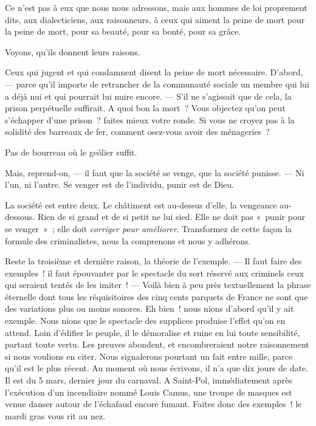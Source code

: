 \documentclass[french,twoside]{book} %
\begin{document}
 Ce n’est pas à eux que nous nous adressons, mais aux hommes de loi proprement dits, aux dialecticiens, aux raisonneurs, à ceux qui aiment la peine de mort pour la peine de mort, pour sa beauté, pour sa bonté, pour sa grâce.\par
Voyons, qu’ils donnent leurs raisons.\par
Ceux qui jugent et qui condamnent disent la peine de mort nécessaire. D’abord, — parce qu’il importe de retrancher de la communauté sociale un membre qui lui a déjà nui et qui pourrait lui nuire encore. — S’il ne s’agissait que de cela, la prison perpétuelle suffirait. A quoi bon la mort ? Vous objectez qu’on peut s’échapper d’une prison ? faites mieux votre ronde. Si vous ne croyez pas à la solidité des barreaux de fer, comment osez-vous avoir des ménageries ?\par
Pas de bourreau où le geôlier suffit.\par
Mais, reprend-on, — il faut que la société se venge, que la société punisse. — Ni l’un, ni l’autre. Se venger est de l’individu, punir est de Dieu.\par
La société est entre deux. Le châtiment est au-dessus d’elle, la vengeance au-dessous. Rien de si grand et de si petit ne lui sied. Elle ne doit pas « punir pour se venger » ; elle doit \emph{corriger pour améliorer}. Transformez de cette façon la formule des criminalistes, nous la comprenons et nous y adhérons.\par
Reste la troisième et dernière raison, la théorie de l’exemple. — Il faut faire des exemples ! il faut épouvanter par le spectacle du sort réservé aux criminels ceux qui seraient tentés de les imiter ! — Voilà bien à peu près textuellement la phrase éternelle dont tous les réquisitoires des cinq cents parquets de France ne sont que des variations  plus ou moins sonores. Eh bien ! nous nions d’abord qu’il y ait exemple. Nous nions que le spectacle des supplices produise l’effet qu’on en attend. Loin d’édifier le peuple, il le démoralise et ruine en lui toute sensibilité, partant toute vertu. Les preuves abondent, et encombreraient notre raisonnement si nous voulions en citer. Nous signalerons pourtant un fait entre mille, parce qu’il est le plus récent. Au moment où nous écrivons, il n’a que dix jours de date. Il est du 5 mars, dernier jour du carnaval. A Saint-Pol, immédiatement après l’exécution d’un incendiaire nommé Louis Camus, une troupe de masques est venue danser autour de l’échafaud encore fumant. Faites donc des exemples ! le mardi gras vous rit au nez.\par
\end{document}
